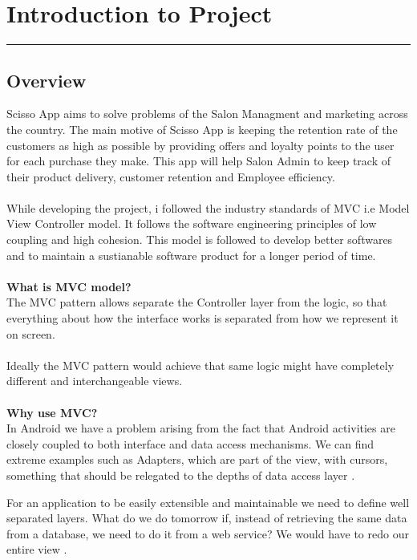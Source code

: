 
\chapter{Introduction to Project}\hrule
\label{Chapter:1}
\section{Overview}

Scisso App aims to solve problems of the Salon Managment and marketing across the country. The main motive of Scisso App is keeping the retention rate of the customers as high as possible by providing offers and loyalty points to the user for each purchase they make. This app will help Salon Admin to keep track of their product delivery, customer retention and Employee efficiency.\\
\\
While developing the project, i followed the industry standards of MVC i.e Model View Controller model. It follows the software engineering principles of low coupling and high cohesion. This model is followed to develop better softwares and to maintain a sustianable software product for a longer period of time.\\
\\
\textbf{What is MVC model?}\\
The MVC pattern allows separate the Controller layer from the logic, so that everything about how the interface works is separated from how we represent it on screen. \\
\\
Ideally the MVC pattern would achieve that same logic might have completely different and interchangeable views.\\
\\
\textbf{Why use MVC?}\\
In Android we have a problem arising from the fact that Android activities are closely coupled to both interface and data access mechanisms. We can find extreme examples such as Adapters, which are part of the view, with cursors, something that should be relegated to the depths of data access layer .

For an application to be easily extensible and maintainable we need to define well separated layers. What do we do tomorrow if, instead of retrieving the same data from a database, we need to do it from a web service? We would have to redo our entire view .

